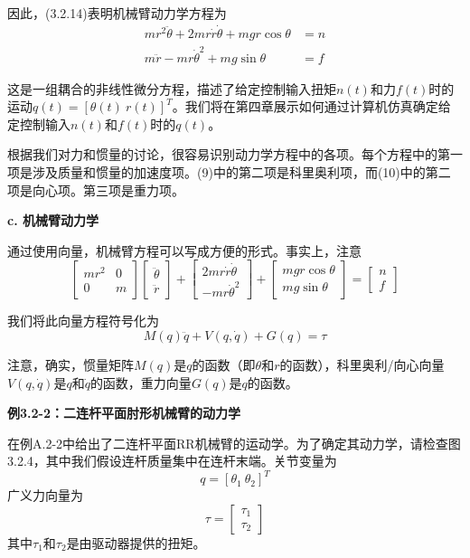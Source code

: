 \documentclass[12pt,a4paper]{ctexart}
\begin{document}
因此，(3.2.14)表明机械臂动力学方程为
\begin{align}
mr^2\ddot{\theta} + 2mr\dot{r}\dot{\theta} + mgr\cos\theta &= n \\
m\ddot{r} - mr\dot{\theta}^2 + mg\sin\theta &= f
\end{align}

这是一组耦合的非线性微分方程，描述了给定控制输入扭矩$n(t)$和力$f(t)$时的运动$q(t) = [\theta(t) \ r(t)]^T$。我们将在第四章展示如何通过计算机仿真确定给定控制输入$n(t)$和$f(t)$时的$q(t)$。

根据我们对力和惯量的讨论，很容易识别动力学方程中的各项。每个方程中的第一项是涉及质量和惯量的加速度项。(9)中的第二项是科里奥利项，而(10)中的第二项是向心项。第三项是重力项。

\textbf{c. 机械臂动力学}

通过使用向量，机械臂方程可以写成方便的形式。事实上，注意
\begin{equation}
\begin{bmatrix} mr^2 & 0 \\ 0 & m \end{bmatrix} \begin{bmatrix} \ddot{\theta} \\ \ddot{r} \end{bmatrix} + \begin{bmatrix} 2mr\dot{r}\dot{\theta} \\ -mr\dot{\theta}^2 \end{bmatrix} + \begin{bmatrix} mgr\cos\theta \\ mg\sin\theta \end{bmatrix} = \begin{bmatrix} n \\ f \end{bmatrix}
\end{equation}

我们将此向量方程符号化为
\begin{equation}
M(q)\ddot{q} + V(q,\dot{q}) + G(q) = \tau
\end{equation}

注意，确实，惯量矩阵$M(q)$是$q$的函数（即$\theta$和$r$的函数），科里奥利/向心向量$V(q,\dot{q})$是$q$和$\dot{q}$的函数，重力向量$G(q)$是$q$的函数。

\textbf{例3.2-2：二连杆平面肘形机械臂的动力学}

在例A.2-2中给出了二连杆平面RR机械臂的运动学。为了确定其动力学，请检查图3.2.4，其中我们假设连杆质量集中在连杆末端。关节变量为
\begin{equation}
q = [\theta_1 \ \theta_2]^T
\end{equation}
广义力向量为
\begin{equation}
\tau = \begin{bmatrix} \tau_1 \\ \tau_2 \end{bmatrix}
\end{equation}
其中$\tau_1$和$\tau_2$是由驱动器提供的扭矩。
\end{document}
